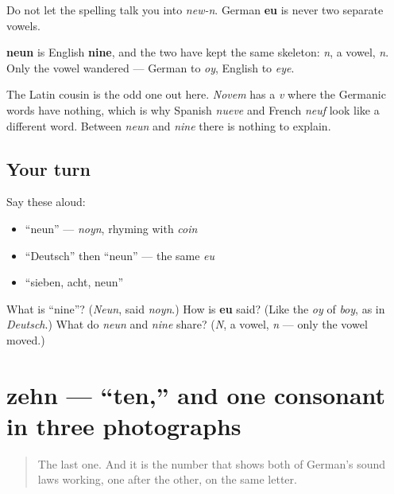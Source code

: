 Do not let the spelling talk you into \emph{new-n}. German \textbf{eu} is never two separate vowels.

\begin{cousinweb}
\textbf{neun} is English \textbf{nine}, and the two have kept the same skeleton: \emph{n}, a vowel, \emph{n}. Only the vowel wandered — German to \emph{oy}, English to \emph{eye}.

The Latin cousin is the odd one out here. \emph{Novem} has a \emph{v} where the Germanic words have nothing, which is why Spanish \emph{nueve} and French \emph{neuf} look like a different word. Between \emph{neun} and \emph{nine} there is nothing to explain.
\end{cousinweb}

\subsection*{Your turn}
Say these aloud:

\begin{itemize}
\raggedright
  \item \textquotedblleft{}neun\textquotedblright{} — \emph{noyn}, rhyming with \emph{coin}
  \item \textquotedblleft{}Deutsch\textquotedblright{} then \textquotedblleft{}neun\textquotedblright{} — the same \emph{eu}
  \item \textquotedblleft{}sieben, acht, neun\textquotedblright{}
\end{itemize}

\begin{tcolorbox}[breakable,colback=teal!4,colframe=teal!35!black,title={Before you move on}]
What is \textquotedblleft{}nine\textquotedblright{}? (\emph{Neun}, said \emph{noyn}.) How is \textbf{eu} said? (Like the \emph{oy} of \emph{boy}, as in \emph{Deutsch}.) What do \emph{neun} and \emph{nine} share? (\emph{N}, a vowel, \emph{n} — only the vowel moved.)
\end{tcolorbox}
\section[zehn]{zehn — \textquotedblleft{}ten,\textquotedblright{} and one consonant in three photographs}

\label{lesson:GE-C06-zehn}



\begin{quote}
The last one. And it is the number that shows both of German's sound laws working, one after the other, on the same letter.
\end{quote}

